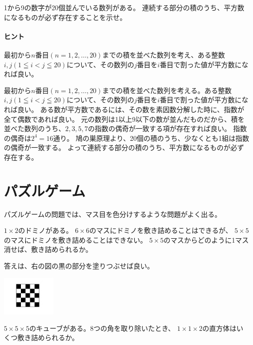 \documentclass[uplatex,dvipdfmx]{jsbook}
\begin{document}
\begin{problem}[練習問題2]
    1から9の数字が20個並んでいる数列がある。
    連続する部分の積のうち、平方数になるものが必ず存在することを示せ。
\end{problem}

\paragraph{ヒント}最初から$n$番目$(n=1,2,\dots,20)$までの積を並べた数列を考え、ある整数$i,j( 1 \leqq i < j \leqq 20 )$について、その数列の$j$番目を$i$番目で割った値が平方数になれば良い。

\begin{answer}
    最初から$n$番目$(n=1,2,\dots,20)$までの積を並べた数列を考える。ある整数$i,j( 1 \leqq i < j \leqq 20 )$について、その数列の$j$番目を$i$番目で割った値が平方数になれば良い。
    ある数が平方数であるには、その数を素因数分解した時に、指数が全て偶数であれば良い。
    元の数列は1以上9以下の数が並んだものだから、積を並べた数列のうち、$2,3,5,7$の指数の偶奇が一致する項が存在すれば良い。
    指数の偶奇は$2^4=16$通り。
    鳩の巣原理より、20個の積のうち、少なくとも1組は指数の偶奇が一致する。
    よって連続する部分の積のうち、平方数になるものが必ず存在する。
\end{answer}

\section{パズルゲーム}

パズルゲームの問題では、マス目を色分けするような問題がよく出る。

\begin{problem}[例題]
    $1\times 2$のドミノがある。
    $6\times 6$のマスにドミノを敷き詰めることはできるが、
    $5\times 5$のマスにドミノを敷き詰めることはできない。
    $5\times 5$のマスからどのように1マス消せば、敷き詰められるか。

    答えは、右の図の黒の部分を塗りつぶせば良い。

    \includegraphics[clip,height=2cm]{figures/c_example.pdf}
\end{problem}

\begin{problem}[練習問題1]
    $5 \times 5 \times 5$のキューブがある。8つの角を取り除いたとき、
    $1 \times 1 \times 2$の直方体はいくつ敷き詰められるか。
\end{problem}
\end{document}
